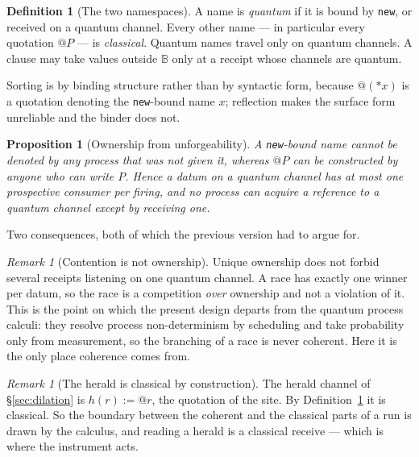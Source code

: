 \documentclass[11pt,a4paper]{article}
\theoremstyle{plain}
\newtheorem{proposition}[theorem]{Proposition}
\theoremstyle{definition}
\newtheorem{definition}[theorem]{Definition}
\theoremstyle{remark}
\newtheorem{remark}[theorem]{Remark}
\newcommand{\Bool}{\mathbb{B}}
\begin{document}
\begin{definition}[The two namespaces]\label{def:namespace}
A name is \emph{quantum} if it is bound by \texttt{new}, or received on a
quantum channel. Every other name --- in particular every quotation $@P$ --- is
\emph{classical}. Quantum names travel only on quantum channels. A clause may
take values outside $\Bool$ only at a receipt whose channels are quantum.
\end{definition}

Sorting is by binding structure rather than by syntactic form, because $@(*x)$
is a quotation denoting the \texttt{new}-bound name $x$; reflection makes the
surface form unreliable and the binder does not.

\begin{proposition}[Ownership from unforgeability]\label{prop:ownership}
A \texttt{new}-bound name cannot be denoted by any process that was not given
it, whereas $@P$ can be constructed by anyone who can write $P$. Hence a datum
on a quantum channel has at most one prospective consumer per firing, and no
process can acquire a reference to a quantum channel except by receiving one.
\end{proposition}

Two consequences, both of which the previous version had to argue for.

\begin{remark}[Contention is not ownership]\label{rem:contention-ownership}
Unique ownership does not forbid several receipts listening on one quantum
channel. A race has exactly one winner per datum, so the race is a competition
\emph{over} ownership and not a violation of it. This is the point on which the
present design departs from the quantum process calculi: they resolve process
non-determinism by scheduling and take probability only from measurement, so the
branching of a race is never coherent. Here it is the only place coherence comes
from.
\end{remark}

\begin{remark}[The herald is classical by construction]\label{rem:herald-class}
The herald channel of \S\ref{sec:dilation} is $h(r) := @r$, the quotation of the
site. By Definition~\ref{def:namespace} it is classical. So the boundary between
the coherent and the classical parts of a run is drawn by the calculus, and
reading a herald is a classical receive --- which is where the instrument acts.
\end{remark}
\end{document}
